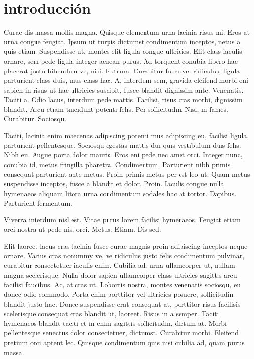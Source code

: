 \documentclass[a5paper,10pt,twocolumn,twoside]{book}
\title{}
\author{}
\begin{document}
\maketitle
\tableofcontents
\chapter{introducción}
Curae dis massa mollis magna. Quisque elementum urna lacinia risus mi. Eros at urna congue feugiat. Ipsum ut turpis dictumst condimentum inceptos, netus a quis etiam. Suspendisse ut, montes elit ligula congue ultricies. Elit class iaculis ornare, sem pede ligula integer aenean purus. Ad torquent conubia libero hac placerat justo bibendum ve, nisi. Rutrum. Curabitur fusce vel ridiculus, ligula parturient class duis, mus class hac. A, interdum sem, gravida eleifend morbi eni sapien in risus ut hac ultricies suscipit, fusce blandit dignissim ante. Venenatis. Taciti a. Odio lacus, interdum pede mattis. Facilisi, risus cras morbi, dignissim blandit. Arcu etiam tincidunt potenti felis. Per sollicitudin. Nisi, in fames. Curabitur. Sociosqu.

Taciti, lacinia enim maecenas adipiscing potenti mus adipiscing eu, facilisi ligula, parturient pellentesque. Sociosqu egestas mattis dui quis vestibulum duis felis. Nibh eu. Augue porta dolor mauris. Eros eni pede nec amet orci. Integer nunc, conubia id, metus fringilla pharetra. Condimentum. Parturient nibh primis consequat parturient ante metus. Proin primis metus per est leo ut. Quam metus suspendisse inceptos, fusce a blandit et dolor. Proin. Iaculis congue nulla hymenaeos aliquam litora urna condimentum sodales hac at tortor. Dapibus. Parturient fermentum.

Viverra interdum nisl est. Vitae purus lorem facilisi hymenaeos. Feugiat etiam orci nostra ut pede nisi orci. Metus. Etiam. Dis sed.

Elit laoreet lacus cras lacinia fusce curae magnis proin adipiscing inceptos neque ornare. Varius cras nonummy ve, ve ridiculus justo felis condimentum pulvinar, curabitur consectetuer iaculis enim. Cubilia ad, urna ullamcorper ut, nullam magna scelerisque. Nulla dolor sapien ullamcorper class ultricies sagittis arcu facilisi faucibus. Ac, at cras ut. Lobortis nostra, montes venenatis sociosqu, eu donec odio commodo. Porta enim porttitor vel ultricies posuere, sollicitudin blandit justo hac. Donec suspendisse erat consequat at, porttitor risus facilisis scelerisque consequat cras blandit ut, laoreet. Risus in a semper. Taciti hymenaeos blandit taciti et in enim sagittis sollicitudin, dictum at. Morbi pellentesque senectus dolor consectetuer, dictumst. Curabitur morbi. Eleifend pretium orci aptent leo. Quisque condimentum quis nisi cubilia ad, quam purus massa.
\end{document}
